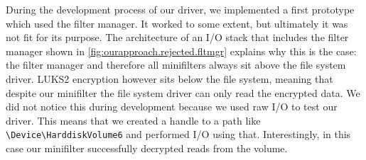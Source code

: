 During the development process of our driver, we implemented a first prototype which used the filter manager. It worked to some extent, but ultimately it was not fit for its purpose. The architecture of an I/O stack that includes the filter manager shown in \autoref{fig:ourapproach.rejected.fltmgr} explains why this is the case: the filter manager and therefore all minifilters always sit above the file system driver. LUKS2 encryption however sits below the file system, meaning that despite our minifilter the file system driver can only read the encrypted data. We did not notice this during development because we used raw I/O to test our driver. This means that we created a handle to a path like \texttt{\textbackslash Device\textbackslash HarddiskVolume6} and performed I/O using that. Interestingly, in this case our minifilter successfully decrypted reads from the volume. %

